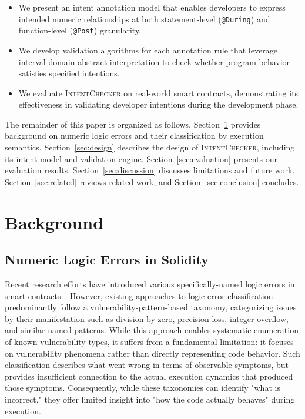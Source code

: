\documentclass[pdflatex,sn-basic]{sn-jnl}%
\theoremstyle{thmstyleone}%
\theoremstyle{thmstyletwo}%
\theoremstyle{thmstylethree}%
\begin{document}
\begin{itemize}
    \item We present an intent annotation model that enables developers to express intended numeric relationships at both statement-level (\texttt{@During}) and function-level (\texttt{@Post}) granularity.
    \item We develop validation algorithms for each annotation rule that leverage interval-domain abstract interpretation to check whether program behavior satisfies specified intentions.
    \item We evaluate \textsc{IntentChecker} on real-world smart contracts, demonstrating its effectiveness in validating developer intentions during the development phase.
\end{itemize}

The remainder of this paper is organized as follows.
Section~\ref{sec:background} provides background on numeric logic errors and their classification by execution semantics.
Section~\ref{sec:design} describes the design of \textsc{IntentChecker}, including its intent model and validation engine.
Section~\ref{sec:evaluation} presents our evaluation results.
Section~\ref{sec:discussion} discusses limitations and future work.
Section~\ref{sec:related} reviews related work, and Section~\ref{sec:conclusion} concludes.

\section{Background}\label{sec:background}
\subsection{Numeric Logic Errors in Solidity}

Recent research efforts have introduced various specifically-named logic errors in smart contracts~\citep{numscout,gptscan,flyinointment,exploitablebugs,defiattacks}.
However, existing approaches to logic error classification predominantly follow a vulnerability-pattern-based taxonomy,
categorizing issues by their manifestation such as division-by-zero, precision-loss, integer overflow, and similar named patterns.
While this approach enables systematic enumeration of known vulnerability types, it suffers from a fundamental limitation:
it focuses on vulnerability phenomena rather than directly representing code behavior.
Such classification describes what went wrong in terms of observable symptoms, but provides insufficient connection to the actual execution dynamics that produced those symptoms.
Consequently, while these taxonomies can identify "what is incorrect," they offer limited insight into "how the code actually behaves" during execution.
\end{document}
